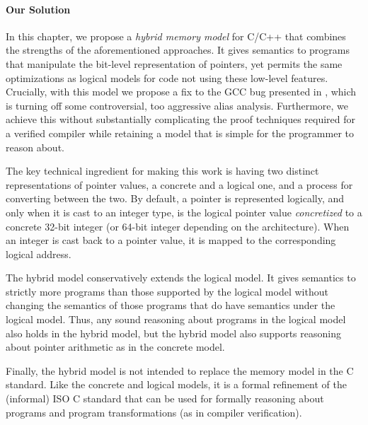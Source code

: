 
\paragraph{Our Solution}

In this chapter, we propose a \emph{hybrid memory model} for C/C++ that combines the strengths of
the aforementioned approaches.  It gives semantics to programs that manipulate the bit-level
representation of pointers, yet permits the same optimizations as logical models for code not using
these low-level features.  Crucially, with this model we propose a fix to the GCC bug presented in
, which is turning off some controversial, too aggressive alias analysis.
Furthermore, we achieve this without substantially complicating the proof techniques required for a
verified compiler while retaining a model that is simple for the programmer to reason about.

The key technical ingredient for making this work is having two
distinct representations of pointer values, a concrete and a logical one,
and a process for converting between the two.
By default, a pointer is represented logically, and only when it is
cast to an integer type, is the logical pointer value
\emph{concretized} to a concrete 32-bit integer (or 64-bit integer depending on the architecture).
When an integer is cast back to a pointer value, 
it is mapped to the corresponding logical address.

The hybrid model conservatively extends the logical model.  It
gives semantics to strictly more programs than those supported by the
logical model without changing the semantics of those programs that do
have semantics under the logical model. Thus, any sound reasoning
about programs in the logical model also holds in the hybrid
model, but the hybrid model also supports reasoning about
pointer arithmetic as in the concrete model.

Finally, the hybrid model is not intended to replace the
memory model in the C standard. Like the concrete and logical models,
it is a formal refinement of the (informal) ISO C standard that can be
used for formally reasoning about programs and program transformations
(as in compiler verification).

